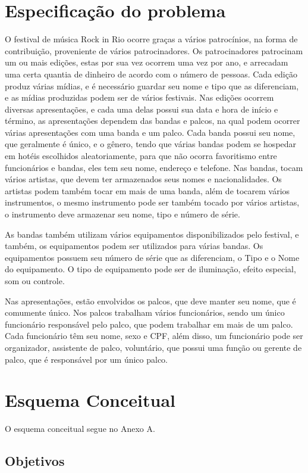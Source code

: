 \documentclass[12pt]{article}
\begin{document}
\tableofcontents %
\pagebreak 
\section{Especificação do problema}
O festival de música Rock in Rio ocorre graças a vários patrocínios, na forma de contribuição, proveniente de vários patrocinadores. Os patrocinadores patrocinam um ou mais edições, estas por sua vez ocorrem uma vez por ano, e arrecadam uma certa quantia de dinheiro de acordo com o número de pessoas. Cada edição produz várias mídias, e é necessário guardar seu nome e tipo que as diferenciam, e as mídias produzidas podem ser de vários festivais. Nas edições ocorrem diversas apresentações, e cada uma delas possui sua data e hora de início e término, as apresentações dependem das bandas e palcos, na qual podem ocorrer várias apresentações com uma banda e um palco. Cada banda possui seu nome, que geralmente é único, e o gênero, tendo que várias bandas podem se hospedar em hotéis escolhidos aleatoriamente, para que não ocorra favoritismo entre funcionários e bandas, eles tem seu nome, endereço e telefone. Nas bandas, tocam vários artistas, que devem ter armazenados seus nomes e nacionalidades. Os artistas podem também tocar em mais de uma banda, além de tocarem vários instrumentos, o mesmo instrumento pode ser também tocado por vários artistas, o instrumento deve armazenar seu nome, tipo e número de série.

As bandas também utilizam vários equipamentos disponibilizados pelo festival, e também, os equipamentos podem ser utilizados para várias bandas. Os equipamentos possuem seu número de série que as diferenciam, o Tipo e o Nome do equipamento. O tipo de equipamento pode ser de iluminação, efeito especial, som ou controle.

Nas apresentações, estão envolvidos os palcos, que deve manter seu nome, que é comumente único. Nos palcos trabalham vários funcionários, sendo um único funcionário responsável pelo palco, que podem trabalhar em mais de um palco. Cada funcionário têm seu nome, sexo e CPF, além disso, um funcionário pode ser organizador, assistente de palco, voluntário, que possui uma função ou gerente de palco, que é responsável por um único palco.

\section{Esquema Conceitual}
O esquema conceitual segue no Anexo A.
\subsection{Objetivos}
\end{document}

